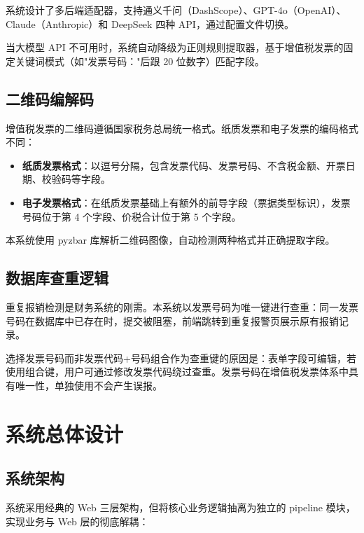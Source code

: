 \documentclass[12pt,a4paper]{ctexart}
\begin{document}
系统设计了多后端适配器，支持通义千问（DashScope）、GPT-4o（OpenAI）、Claude（Anthropic）和 DeepSeek 四种 API，通过配置文件切换。

当大模型 API 不可用时，系统自动降级为正则规则提取器，基于增值税发票的固定关键词模式（如"发票号码："后跟 20 位数字）匹配字段。

\subsection{二维码编解码}

增值税发票的二维码遵循国家税务总局统一格式。纸质发票和电子发票的编码格式不同：

\begin{itemize}
  \item \textbf{纸质发票格式}：以逗号分隔，包含发票代码、发票号码、不含税金额、开票日期、校验码等字段。
  \item \textbf{电子发票格式}：在纸质发票基础上有额外的前导字段（票据类型标识），发票号码位于第 4 个字段、价税合计位于第 5 个字段。
\end{itemize}

本系统使用 pyzbar 库解析二维码图像，自动检测两种格式并正确提取字段。

\subsection{数据库查重逻辑}

重复报销检测是财务系统的刚需。本系统以发票号码为唯一键进行查重：同一发票号码在数据库中已存在时，提交被阻塞，前端跳转到重复报警页展示原有报销记录。

选择发票号码而非发票代码+号码组合作为查重键的原因是：表单字段可编辑，若使用组合键，用户可通过修改发票代码绕过查重。发票号码在增值税发票体系中具有唯一性，单独使用不会产生误报。


\section{系统总体设计}

\subsection{系统架构}

系统采用经典的 Web 三层架构，但将核心业务逻辑抽离为独立的 pipeline 模块，实现业务与 Web 层的彻底解耦：
\end{document}
